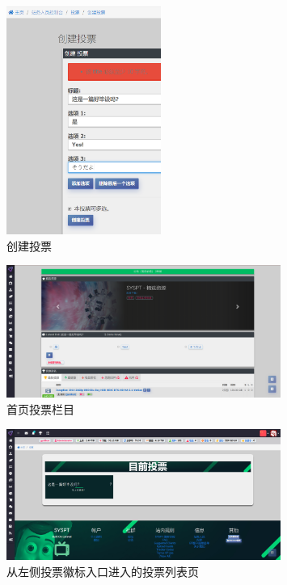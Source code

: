 

\begin{figure}[h]
    \centering
    \includegraphics[width=0.45\textwidth]{support-files/5.x-poll-create-page-4.png}
    \caption{创建投票}
    \label{fig:createpoll}
\end{figure}



\begin{figure}[h]
    \centering
    \includegraphics[width=0.8\textwidth]{support-files/5.x-poll-index-div.png}
    \caption{首页投票栏目}
    \label{fig:indexpoll}
\end{figure}



\begin{figure}[h]
    \centering
    \includegraphics[width=0.8\textwidth]{support-files/5.x-poll-spec-page.png}
    \caption{从左侧投票徽标入口进入的投票列表页}
    \label{fig:leftnavpollentrance}
\end{figure}


